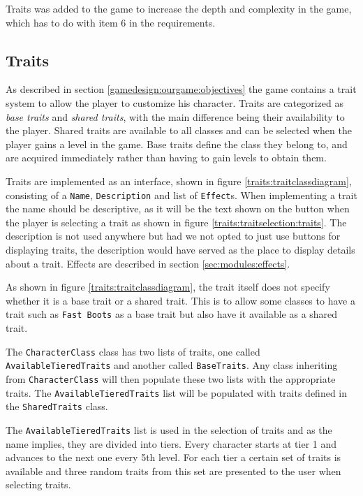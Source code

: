 Traits was added to the game to increase the depth and complexity in the game, which has to do with item 6 in the requirements.
\subsection{Traits}
\label{sec:modules:traits}
As described in section \ref{gamedesign:ourgame:objectives} the game contains a trait system to allow the player to customize his character.
Traits are categorized as \textit{base traits} and \textit{shared traits}, with the main difference being their availability to the player.
Shared traits are available to all classes and can be selected when the player gains a level in the game.
Base traits define the class they belong to, and are acquired immediately rather than having to gain levels to obtain them.

Traits are implemented as an interface, shown in figure \ref{traits:traitclassdiagram}, consisting of a \texttt{Name}, \texttt{Description} and list of \texttt{Effect}s.
When implementing a trait the name should be descriptive, as it will be the text shown on the button when the player is selecting a trait as shown in figure \ref{traits:traitselection:traits}. 
The description is not used anywhere but had we not opted to just use buttons for displaying traits, the description would have served as the place to display details about a trait.
Effects are described in section \ref{sec:modules:effects}.

As shown in figure \ref{traits:traitclassdiagram}, the trait itself does not specify whether it is a base trait or a shared trait.
This is to allow some classes to have a trait such as \texttt{Fast Boots} as a base trait but also have it available as a shared trait.

The \texttt{CharacterClass} class has two lists of traits, one called \texttt{AvailableTier\-edTraits} and another called \texttt{BaseTraits}.
Any class inheriting from \texttt{Character\-Class} will then populate these two lists with the appropriate traits.
The \texttt{AvailableTieredTraits} list will be populated with traits defined in the \texttt{Shared\-Traits} class.

The \texttt{AvailableTieredTraits} list is used in the selection of traits and as the name implies, they are divided into tiers.
Every character starts at tier 1 and advances to the next one every 5th level.
For each tier a certain set of traits is available and three random traits from this set are presented to the user when selecting traits.

